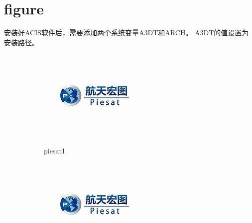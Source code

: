 \documentclass[12pt]{report}
\begin{document}
\section{figure}
安装好ACIS软件后，需要添加两个系统变量A3DT和ARCH。
A3DT的值设置为安装路径。
\begin{figure}
    \centering
    \begin{subfigure}[b]{0.3\textwidth}
        \centering
        \includegraphics[width=\textwidth]{piesat.jpg}
        \caption{piesat1}
        \label{piesat1}
    \end{subfigure}
    \begin{subfigure}[b]{0.3\textwidth}
        \centering
        \includegraphics[width=\textwidth]{piesat.jpg}

\end{subfigure}
\end{figure}
\end{document}
